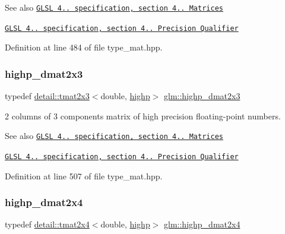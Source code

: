 \begin{DoxySeeAlso}{See also}
\href{http://www.opengl.org/registry/doc/GLSLangSpec.4.20.8.pdf}{\tt G\+L\+SL 4.. specification, section 4.. Matrices} 

\href{http://www.opengl.org/registry/doc/GLSLangSpec.4.20.8.pdf}{\tt G\+L\+SL 4.. specification, section 4.. Precision Qualifier} 
\end{DoxySeeAlso}


Definition at line 484 of file type\+\_\+mat.\+hpp.

\mbox{\label{group__core__precision_gafec7367665f006f2a7643103c5eddc38}} 
\subsubsection{\texorpdfstring{highp\+\_\+dmat2x3}{highp\_dmat2x3}}
{\footnotesize\ttfamily typedef \hyperlink{structglm_1_1detail_1_1tmat2x3}{detail\+::tmat2x3}$<$double, \hyperlink{namespaceglm_a0f04f086094c747d227af4425893f545ac6f7eab42eacbb10d59a58e95e362074}{highp}$>$ \hyperlink{group__core__precision_gafec7367665f006f2a7643103c5eddc38}{glm\+::highp\+\_\+dmat2x3}}

2 columns of 3 components matrix of high precision floating-\/point numbers.

\begin{DoxySeeAlso}{See also}
\href{http://www.opengl.org/registry/doc/GLSLangSpec.4.20.8.pdf}{\tt G\+L\+SL 4.. specification, section 4.. Matrices} 

\href{http://www.opengl.org/registry/doc/GLSLangSpec.4.20.8.pdf}{\tt G\+L\+SL 4.. specification, section 4.. Precision Qualifier} 
\end{DoxySeeAlso}


Definition at line 507 of file type\+\_\+mat.\+hpp.

\mbox{\label{group__core__precision_gacd51d8188f7d66a83c035b8c4cd69f2d}} 
\subsubsection{\texorpdfstring{highp\+\_\+dmat2x4}{highp\_dmat2x4}}
{\footnotesize\ttfamily typedef \hyperlink{structglm_1_1detail_1_1tmat2x4}{detail\+::tmat2x4}$<$double, \hyperlink{namespaceglm_a0f04f086094c747d227af4425893f545ac6f7eab42eacbb10d59a58e95e362074}{highp}$>$ \hyperlink{group__core__precision_gacd51d8188f7d66a83c035b8c4cd69f2d}{glm\+::highp\+\_\+dmat2x4}}

